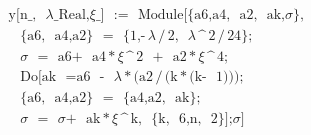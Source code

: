 \documentclass{article}
\begin{document}
{\ttfamily
$\begin{array}{l}
\text{y}\text{[}\text{n\_}\text{,}\text{ }\text{$\lambda$\_Real}\text{,}\text{
}\text{$\xi$\_}\text{]}\text{ }\text{:=}\text{ }\text{Module}\text{[}\text{\{}\text{a6}\text{,}\text{
}\text{a4}\text{,}\text{ }\text{a2}\text{,}\text{ }\text{ak}\text{,}\text{
}\text{$\sigma$}\text{\}}\text{,}\text{ }\\
\text{\ \ \ }\,\text{\{}\text{a6}\text{,}\text{ }\text{a4}\text{,}\text{
}\text{a2}\text{\}}\text{ }\text{=}\text{ }\text{\{}\text{1}\text{,}\text{
}\text{-}\,\text{$\lambda$}\,\text{/}\,\text{2}\text{,}\text{ }\text{$\lambda$}\,\text{\textasciicircum
}\,\text{2}\,\text{/}\,\text{24}\text{\}}\text{;}\text{ }\\
\text{\ \ \ \ }\,\text{$\sigma$}\text{ }\text{=}\text{ }\text{a6}\text{
}\text{+}\text{ }\text{a4}\,\text{*}\,\text{$\xi$}\,\text{\textasciicircum
}\,\text{2}\text{ }\text{+}\text{ }\text{a2}\,\text{*}\,\text{$\xi$}\,\text{\textasciicircum
}\,\text{4}\text{;}\text{ }\\
\text{\ \ \ \ }\,\text{Do}\text{[}\text{ak}\text{ }\text{=}\text{
}\text{a6}\text{ }\text{-}\text{ }\text{$\lambda$}\,\text{*}\,\text{(}\text{a2}\,\text{/}\,\text{(}\text{k}\,\text{*}\,\text{(}\text{k}\text{
}\text{-}\text{ }\text{1}\text{)}\text{)}\text{)}\text{;}\text{
}\\
\text{\ \ \ \ \ \ }\,\text{\{}\text{a6}\text{,}\text{ }\text{a4}\text{,}\text{
}\text{a2}\text{\}}\text{ }\text{=}\text{ }\text{\{}\text{a4}\text{,}\text{
}\text{a2}\text{,}\text{ }\text{ak}\text{\}}\text{;}\text{ }\\
\text{\ \ \ \ \ \ }\,\text{$\sigma$}\text{ }\text{=}\text{ }\text{$\sigma$}\text{
}\text{+}\text{ }\text{ak}\,\text{*}\,\text{$\xi$}\,\text{\textasciicircum
}\,\text{k}\text{,}\text{ }\text{\{}\text{k}\text{,}\text{ }\text{6}\text{,}\text{
}\text{n}\text{,}\text{ }\text{2}\text{\}}\text{]}\text{;}\text{
}\text{$\sigma$}\text{]}\end{array}$}
\end{document}
